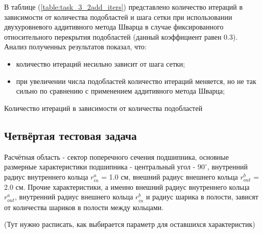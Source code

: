 \documentclass[a4paper]{article}
\begin{document}
В таблице (\ref{table:task_3_2add_iters}) представлено количество итераций в зависимости от количества подобластей и шага сетки при использовании двухуровневого аддитивного метода Шварца в случае фиксированного относительного перекрытия подобластей (данный коэффициент равен 0.3). Анализ полученных результатов показал, что:
\begin{itemize}
\item количество итераций несильно зависит от шага сетки;
\item при увеличении числа подобластей количество итераций меняется, но не так сильно по сравнению с применением аддитивного метода Шварца;
\end{itemize}

\begin{table}[h]
\caption{Количество итераций в зависимости от количества подобластей}
\label{table:task_3_2add_iters}
\end{table}

\newpage

\subsection{Четвёртая тестовая задача}

Расчётная область - сектор поперечного сечения подшипника, основные размерные характеристики подшипника - центральный угол - $90^{\circ}$, внутренний радиус внутреннего кольца $r_{in}^a$ = 1.0 см, внешний радиус внешнего кольца $r_{out}^b$ = 2.0 см. Прочие характеристики, а именно внешний радиус внутреннего кольца $r_{out}^a$, внутренний радиус внешнего кольца $r_{in}^b$ и радиус шарика в полости, зависят от количества шариков в полости между кольцами.

(Тут нужно расписать, как выбирается параметр для оставшихся характеристик)
\end{document}
